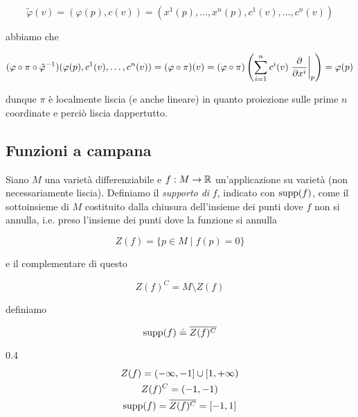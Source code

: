 \begin{equation}
	\tilde{\varphi}(v) = (\varphi(p),c(v)) = (x^{1}(p),\dots,x^{n}(p),c^{1}(v),\dots,c^{n}(v))
\end{equation}

abbiamo che

\begin{equation}
	(\varphi \circ \pi \circ \tilde{\varphi}^{-1}) (\varphi(p),c^{1}(v),\dots,c^{n}(v)) = (\varphi \circ \pi)(v) = (\varphi \circ \pi) \left( \sum_{i=1}^{n} c^{i}(v) \eval{ \pdv{x^{i}} }_{p} \right) = \varphi(p)
\end{equation}

dunque $ \pi $ è localmente liscia (e anche lineare) in quanto proiezione sulle prime $ n $ coordinate e perciò liscia dappertutto.

\subsection{Funzioni a campana}

Siano $ M $ una varietà differenziabile e $ f : M \to \mathbb{R} $ un'applicazione su varietà (non necessariamente liscia). Definiamo il \textit{supporto di} $ f $, indicato con $ \operatorname{supp}(f) $, come il sottoinsieme di $ M $ costituito dalla chiusura dell'insieme dei punti dove $ f $ non si annulla, i.e. preso l'insieme dei punti dove la funzione si annulla

\begin{equation}
	Z(f) = \{ p \in M \mid f(p) = 0 \}
\end{equation}

e il complementare di questo

\begin{equation}
	Z(f)^{C} = M \setminus Z(f)
\end{equation}

definiamo

\begin{equation}
	\operatorname{supp}(f) \doteq \overline{Z(f)^{C}}
\end{equation}

	{0.4}{%
			\begin{gather}
				Z(f) = (-\infty,-1] \cup [1,+\infty) \\
				Z(f)^{C} = (-1,-1) \\
				\operatorname{supp}(f) = \overline{Z(f)^{C}} = [-1,1]
			\end{gather}
			}

